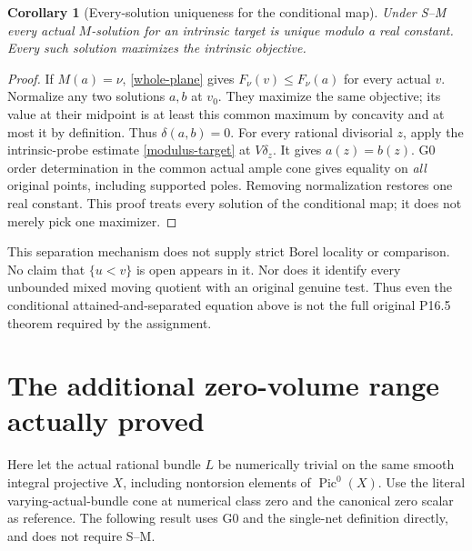 \documentclass[10pt]{article}
\newtheorem{corollary}[theorem]{Corollary}
\begin{document}
\begin{corollary}[Every-solution uniqueness for the conditional map]
Under S--M every actual $M$-solution for an intrinsic target is unique
modulo a real constant. Every such solution maximizes the intrinsic objective.
\end{corollary}
\begin{proof}
If $M(a)=\nu$, \eqref{whole-plane} gives $F_\nu(v)\leq F_\nu(a)$
for every actual $v$. Normalize any two solutions $a,b$ at $v_0$.
They maximize the same objective; its value at their midpoint is
at least this common maximum by concavity and at most it by definition.
Thus $\delta(a,b)=0$.
For every rational divisorial $z$, apply the intrinsic-probe estimate
\eqref{modulus-target} at $V\delta_z$. It gives $a(z)=b(z)$.
G0 order determination in the common actual ample cone gives equality
on \emph{all} original points, including supported poles. Removing
normalization restores one real constant. This proof treats every
solution of the conditional map; it does not merely pick one maximizer.
\end{proof}

This separation mechanism does not supply strict Borel locality or comparison.
No claim that $\{u<v\}$ is open appears in it. Nor does it identify every
unbounded mixed moving quotient with an original genuine test. Thus even
the conditional attained-and-separated equation above is not the full
original P16.5 theorem required by the assignment.

\section{The additional zero-volume range actually proved}
Here let the actual rational bundle $L$ be numerically trivial on the
same smooth integral projective $X$, including nontorsion elements of
$\operatorname{Pic}^0(X)$. Use the literal varying-actual-bundle cone
at numerical class zero and the canonical zero scalar as reference.
The following result uses G0 and the single-net definition directly,
and does not require S--M.
\end{document}
